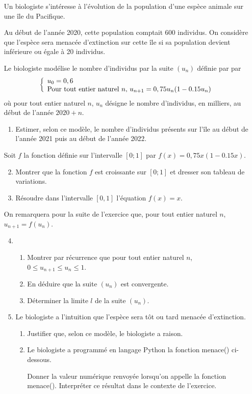 \documentclass[11pt,fleqn, openany]{book} %
\begin{document}
\begin{exercise}[subtitle={(Amérique du Nord 2021)}]Un biologiste s'intéresse à l'évolution de la population d'une espèce animale sur une île du Pacifique.

Au début de l'année 2020, cette population comptait 600 individus. On considère que l'espèce sera menacée d'extinction sur cette île si sa population devient inférieure ou égale à 20 individus.

Le biologiste modélise le nombre d'individus par la suite $(u_n)$
définie par par\[\left\{\renewcommand{\arraystretch}{1}\begin{array}{ll}u_0=0,6\\ \text{Pour tout entier naturel }n,\, u_{n+1}=0,75u_n(1-0.15u_n)\end{array}\right.\]
où pour tout entier naturel $n$, $u_n$ désigne le nombre d'individus, en milliers, au début de l'année $2020+n$.
\begin{enumerate}
\item Estimer, selon ce modèle, le nombre d'individus présents sur l'île au début de l'année 2021 puis au début de l'année 2022.
\end{enumerate}
Soit $f$ la fonction définie sur l'intervalle $[0;1]$ par $f(x)=0,75x(1-0.15x)$.
\begin{enumerate}
\setcounter{enumi}{1}
\item  Montrer que la fonction $f$ est croissante sur $[0;1]$ et dresser son tableau de variations.
\item Résoudre dans l'intervalle $[0,1]$ l'équation $f(x)=x$.
\end{enumerate}
On remarquera pour la suite de l'exercice que, pour tout entier naturel $n$, $u_{n+1}=f(u_n)$.
\begin{enumerate}
\setcounter{enumi}{3}
\item \begin{enumerate}
\item Montrer par récurrence que pour tout entier naturel $n$, $0\leqslant u_{n+1} \leqslant u_n \leqslant 1$.
\item En déduire que la suite $(u_n)$ est convergente.
\item Déterminer la limite $l$ de la suite $(u_n)$.
\end{enumerate}
\item Le biologiste a l'intuition que l'espèce sera tôt ou tard menacée d'extinction.
\begin{enumerate}
\item Justifier que, selon ce modèle, le biologiste a raison.
\item Le biologiste a programmé en langage Python la fonction menace() ci-dessous.




Donner la valeur numérique renvoyée lorsqu'on appelle la fonction menace().
Interpréter ce résultat dans le contexte de l'exercice.
\end{enumerate}
\end{enumerate}
\newpage
\end{exercise}
\end{document}

